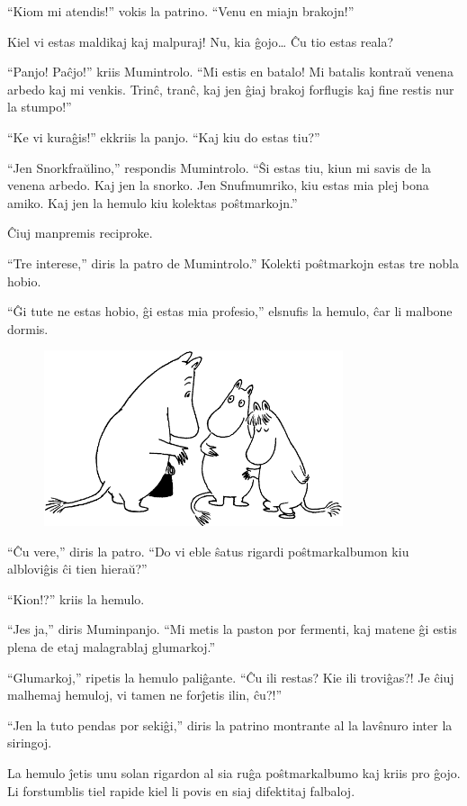 ``Kiom mi atendis!'' vokis la patrino. ``Venu en miajn brakojn!''

Kiel vi estas maldikaj kaj malpuraj! Nu, kia ĝojo{\ldots} Ĉu tio estas reala?

``Panjo! Paĉjo!'' kriis Mumintrolo. ``Mi estis en batalo! Mi batalis kontraŭ venena arbedo kaj mi venkis. Trinĉ, tranĉ, kaj jen ĝiaj brakoj forflugis kaj fine restis nur la stumpo!''

``Ke vi kuraĝis!'' ekkriis la panjo. ``Kaj kiu do estas tiu?''

``Jen Snorkfraŭlino,'' respondis Mumintrolo. ``Ŝi estas tiu, kiun mi savis de la venena arbedo. Kaj jen la snorko. Jen Snufmumriko, kiu estas mia plej bona amiko. Kaj jen la hemulo kiu kolektas poŝtmarkojn.''

Ĉiuj manpremis reciproke.

``Tre interese,'' diris la patro de Mumintrolo.'' Kolekti poŝtmarkojn estas tre nobla hobio.

``Ĝi tute ne estas hobio, ĝi estas mia profesio,'' elsnufis la hemulo, ĉar li malbone dormis.

\begin{figure}[htbp]
\centering
\includegraphics[width=250pt,height=146pt]{9-2.png}
\caption{}
\label{9-2}
\end{figure}

``Ĉu vere,'' diris la patro. ``Do vi eble ŝatus rigardi poŝtmarkalbumon kiu albloviĝis ĉi tien hieraŭ?''

``Kion!?'' kriis la hemulo.

``Jes ja,'' diris Muminpanjo. ``Mi metis la paston por fermenti, kaj matene ĝi estis plena de etaj malagrablaj glumarkoj.''

``Glumarkoj,'' ripetis la hemulo paliĝante. ``Ĉu ili restas? Kie ili troviĝas?! Je ĉiuj malhemaj hemuloj, vi tamen ne forĵetis ilin, ĉu?!''

``Jen la tuto pendas por sekiĝi,'' diris la patrino montrante al la lavŝnuro inter la siringoj.

La hemulo ĵetis unu solan rigardon al sia ruĝa poŝtmarkalbumo kaj kriis pro ĝojo. Li forstumblis tiel rapide kiel li povis en siaj difektitaj falbaloj.

